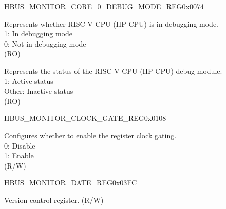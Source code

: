 \begin{register}{H}{BUS\_MONITOR\_CORE\_0\_DEBUG\_MODE\_REG}{0x0074}\label{regdesc:BUSMONITORCORE0DEBUGMODEREG}
%
%
%
\regnewline%
\begin{regdesc}\begin{reglist}
\label{fielddesc:BUSMONITORCORE0DEBUGMODE}\item [BUS\_MONITOR\_CORE\_0\_DEBUG\_MODE] Represents whether RISC-V CPU (HP CPU) is in debugging mode.\\
1: In debugging mode\\
0: Not in debugging mode\\
(RO)
\label{fielddesc:BUSMONITORCORE0DEBUGMODULEACTIVE}\item [BUS\_MONITOR\_CORE\_0\_DEBUG\_MODULE\_ACTIVE] Represents the status of the RISC-V CPU (HP CPU) debug module.\\
1: Active status\\
Other: Inactive status\\
(RO)
\end{reglist}\end{regdesc}
\end{register}


\begin{register}{H}{BUS\_MONITOR\_CLOCK\_GATE\_REG}{0x0108}\label{regdesc:BUSMONITORCLOCKGATEREG}
%
%
\regnewline%
\begin{regdesc}\begin{reglist}
\label{fielddesc:BUSMONITORCLKEN}\item [BUS\_MONITOR\_CLK\_EN] Configures whether to enable the register clock gating. \\
0: Disable\\
1: Enable\\
(R/W)
\end{reglist}\end{regdesc}
\end{register}


\begin{register}{H}{BUS\_MONITOR\_DATE\_REG}{0x03FC}\label{regdesc:BUSMONITORDATEREG}
%
%
\regnewline%
\begin{regdesc}\begin{reglist}
\label{fielddesc:BUSMONITORDATE}\item [BUS\_MONITOR\_DATE] Version control register. (R/W)
\end{reglist}\end{regdesc}
\end{register}
